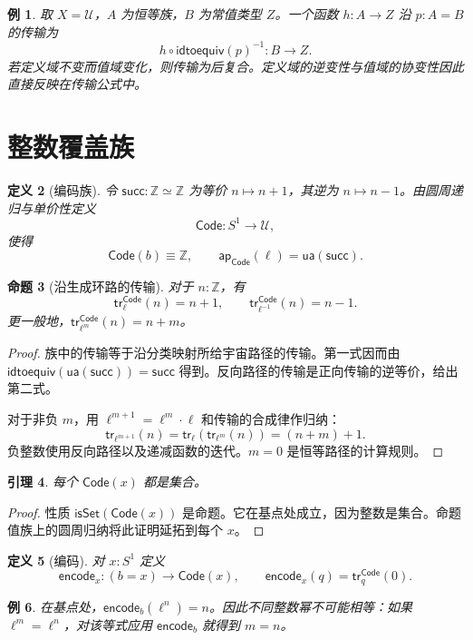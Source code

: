 \documentclass[12pt,oneside,openany,fontset=none]{ctexbook}
\theoremstyle{cn}
\newtheorem{definition}{定义}[chapter]
\newtheorem{example}[definition]{例}
\newtheorem{lemma}[definition]{引理}
\newtheorem{proposition}[definition]{命题}
\numberwithin{equation}{chapter}
\newcommand{\U}{\mathcal U}
\newcommand{\ap}{\mathsf{ap}}
\newcommand{\tr}{\mathsf{tr}}
\newcommand{\isSet}{\mathsf{isSet}}
\newcommand{\ua}{\mathsf{ua}}
\newcommand{\idtoequiv}{\mathsf{idtoequiv}}
\newcommand{\Z}{\mathbb Z}
\begin{document}
\begin{example}
取 $X=\U$，$A$ 为恒等族，$B$ 为常值类型 $Z$。一个函数 $h:A\to Z$ 沿 $p:A=B$ 的传输为
\[
 h\circ\idtoequiv(p)^{-1}:B\to Z.
\]
若定义域不变而值域变化，则传输为后复合。定义域的逆变性与值域的协变性因此直接反映在传输公式中。
\end{example}

\section{整数覆盖族}

\begin{definition}[编码族]
令 $\mathsf{succ}:\Z\simeq\Z$ 为等价 $n\mapsto n+1$，其逆为 $n\mapsto n-1$。由圆周递归与单价性定义
\[
 \mathsf{Code}:S^1\to\U,
\]
使得
\[
 \mathsf{Code}(b)\equiv\Z,\qquad
 \ap_{\mathsf{Code}}(\ell)=\ua(\mathsf{succ}).
\]
\end{definition}

\begin{proposition}[沿生成环路的传输]
对于 $n:\Z$，有
\[
 \tr^{\mathsf{Code}}_\ell(n)=n+1,
 \qquad
 \tr^{\mathsf{Code}}_{\ell^{-1}}(n)=n-1.
\]
更一般地，$\tr^{\mathsf{Code}}_{\ell^m}(n)=n+m$。
\end{proposition}
\begin{proof}
族中的传输等于沿分类映射所给宇宙路径的传输。第一式因而由 $\idtoequiv(\ua(\mathsf{succ}))=\mathsf{succ}$ 得到。反向路径的传输是正向传输的逆等价，给出第二式。

对于非负 $m$，用 $\ell^{m+1}=\ell^m\cdot\ell$ 和传输的合成律作归纳：
\[
 \tr_{\ell^{m+1}}(n)
 =\tr_\ell(\tr_{\ell^m}(n))
 =(n+m)+1.
\]
负整数使用反向路径以及递减函数的迭代。$m=0$ 是恒等路径的计算规则。
\end{proof}

\begin{lemma}
每个 $\mathsf{Code}(x)$ 都是集合。
\end{lemma}
\begin{proof}
性质 $\isSet(\mathsf{Code}(x))$ 是命题。它在基点处成立，因为整数是集合。命题值族上的圆周归纳将此证明延拓到每个 $x$。
\end{proof}

\begin{definition}[编码]
对 $x:S^1$ 定义
\[
 \mathsf{encode}_x:(b=x)\to\mathsf{Code}(x),
 \qquad
 \mathsf{encode}_x(q)=\tr^{\mathsf{Code}}_q(0).
\]
\end{definition}

\begin{example}
在基点处，$\mathsf{encode}_b(\ell^n)=n$。因此不同整数幂不可能相等：如果 $\ell^m=\ell^n$，对该等式应用 $\mathsf{encode}_b$ 就得到 $m=n$。
\end{example}
\end{document}

